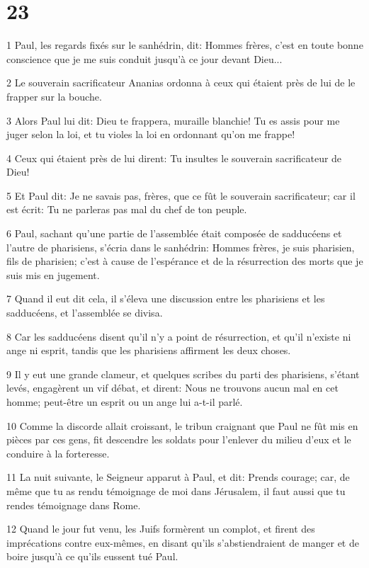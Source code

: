 \chapter{23}

\par 1 Paul, les regards fixés sur le sanhédrin, dit: Hommes frères, c'est en toute bonne conscience que je me suis conduit jusqu'à ce jour devant Dieu...
\par 2 Le souverain sacrificateur Ananias ordonna à ceux qui étaient près de lui de le frapper sur la bouche.
\par 3 Alors Paul lui dit: Dieu te frappera, muraille blanchie! Tu es assis pour me juger selon la loi, et tu violes la loi en ordonnant qu'on me frappe!
\par 4 Ceux qui étaient près de lui dirent: Tu insultes le souverain sacrificateur de Dieu!
\par 5 Et Paul dit: Je ne savais pas, frères, que ce fût le souverain sacrificateur; car il est écrit: Tu ne parleras pas mal du chef de ton peuple.
\par 6 Paul, sachant qu'une partie de l'assemblée était composée de sadducéens et l'autre de pharisiens, s'écria dans le sanhédrin: Hommes frères, je suis pharisien, fils de pharisien; c'est à cause de l'espérance et de la résurrection des morts que je suis mis en jugement.
\par 7 Quand il eut dit cela, il s'éleva une discussion entre les pharisiens et les sadducéens, et l'assemblée se divisa.
\par 8 Car les sadducéens disent qu'il n'y a point de résurrection, et qu'il n'existe ni ange ni esprit, tandis que les pharisiens affirment les deux choses.
\par 9 Il y eut une grande clameur, et quelques scribes du parti des pharisiens, s'étant levés, engagèrent un vif débat, et dirent: Nous ne trouvons aucun mal en cet homme; peut-être un esprit ou un ange lui a-t-il parlé.
\par 10 Comme la discorde allait croissant, le tribun craignant que Paul ne fût mis en pièces par ces gens, fit descendre les soldats pour l'enlever du milieu d'eux et le conduire à la forteresse.
\par 11 La nuit suivante, le Seigneur apparut à Paul, et dit: Prends courage; car, de même que tu as rendu témoignage de moi dans Jérusalem, il faut aussi que tu rendes témoignage dans Rome.
\par 12 Quand le jour fut venu, les Juifs formèrent un complot, et firent des imprécations contre eux-mêmes, en disant qu'ils s'abstiendraient de manger et de boire jusqu'à ce qu'ils eussent tué Paul.
